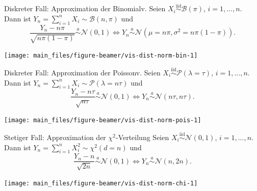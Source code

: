 \documentclass[
  10pt,
  ignorenonframetext,
]{beamer}
\begin{document}
\begin{frame}{Diskreter Fall: Approximation der Binomialv.}
\label{diskreter-fall-approximation-der-binomialv.}
Seien \(X_i \stackrel{\text{iid}}{\sim} {\mathcal B}(\pi)\),
\(i=1,..., n\). Dann ist
\(Y_n = \sum_{i=1}^n X_i \sim  {\mathcal B}(n, \pi)\) und \[
\frac{Y_n - n \pi}{\sqrt{ n \pi (1 -
\pi)}} \stackrel{a}{\sim}  {\mathcal N}(0,1)
\iff 
Y_n  \stackrel{a}{\sim}  {\mathcal N}\left(\mu = n \pi, \sigma^2 = n \pi(1 - \pi)\right).
\]

\scriptsize

\begin{center}\texttt{[image: main\_files/figure-beamer/vis-dist-norm-bin-1]} \end{center}

\normalsize
\end{frame}

\begin{frame}{Diskreter Fall: Approximation der Poissonv.}
\label{diskreter-fall-approximation-der-poissonv.}
Seien \(X_i \stackrel{\text{iid}}{\sim} {\mathcal P}(\lambda = \tau)\),
\(i=1,..., n\). Dann ist
\(Y_n = \sum_{i=1}^n X_i \sim {\mathcal P}(\lambda = n \tau)\) und \[
\frac{Y_n - n \tau}{\sqrt{n \tau}} \stackrel{a}{\sim}  {\mathcal N}(0,1)
\iff 
Y_n  \stackrel{a}{\sim}  {\mathcal N}\left(n \tau,  n \tau\right).
\]

\scriptsize

\begin{center}\texttt{[image: main\_files/figure-beamer/vis-dist-norm-pois-1]} \end{center}

\normalsize
\end{frame}

\begin{frame}{Stetiger Fall: Approximation der \(\chi^2\)-Verteilung}
\label{stetiger-fall-approximation-der-chi2-verteilung}
Seien \(X_i \stackrel{\text{iid}}{\sim} {\mathcal N}(0, 1)\),
\(i=1,..., n\). Dann ist \(Y_n = \sum_{i=1}^n X_i^2 \sim \chi^2(d = n)\)
und \[
\frac{Y_n - n}{\sqrt{2n}} \stackrel{a}{\sim}  {\mathcal N}(0,1)
\iff 
Y_n  \stackrel{a}{\sim}  {\mathcal N}\left(n,  2n\right).
\]

\scriptsize

\begin{center}\texttt{[image: main\_files/figure-beamer/vis-dist-norm-chi-1]} \end{center}

\normalsize
\end{frame}
\end{document}
